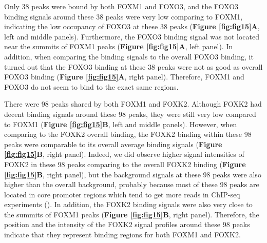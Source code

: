 Only 38 peaks were bound by both FOXM1 and FOXO3, and the FOXO3 binding signals around these 38 peaks were very low comparing to FOXM1, indicating the low occupancy of FOXO3 at these 38 peaks (\textbf{Figure \ref{fig:fig15}A}, left and middle panels). Furthermore, the FOXO3 binding signal was not located near the summits of FOXM1 peaks (\textbf{Figure \ref{fig:fig15}A}, left panel). In addition, when comparing the binding signals to the overall FOXO3 binding, it turned out that the FOXO3 binding at these 38 peaks were not as good as overall FOXO3 binding (\textbf{Figure \ref{fig:fig15}A}, right panel). Therefore, FOXM1 and FOXO3 do not seem to bind to the exact same regions.

There were 98 peaks shared by both FOXM1 and FOXK2. Although FOXK2 had decent binding signals around these 98 peaks, they were still very low compared to FOXM1 (\textbf{Figure \ref{fig:fig15}B}, left and middle panels). However, when comparing to the FOXK2 overall binding, the FOXK2 binding within these 98 peaks were comparable to its overall average binding signals (\textbf{Figure \ref{fig:fig15}B}, right panel). Indeed, we did observe higher signal intensities of FOXK2 in these 98 peaks comparing to the overall FOXK2 binding (\textbf{Figure \ref{fig:fig15}B}, right panel), but the background signals at these 98 peaks were also higher than the overall background, probably because most of these 98 peaks are located in core promoter regions which tend to get more reads in ChIP-seq experiments (\cite{auerbach2009mapping,cheung2011systematic}). In addition, the FOXK2 binding signals were also very close to the summits of FOXM1 peaks (\textbf{Figure \ref{fig:fig15}B}, right panel). Therefore, the position and the intensity of the FOXK2 signal profiles around these 98 peaks indicate that they represent binding regions for both FOXM1 and FOXK2.

